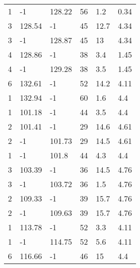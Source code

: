 \begin{table*}[h!]
\begin{tabular*}{\linewidth}{p{50pt}<{\centering}p{50pt}<{\centering}
p{60pt}<{\centering}p{60pt}<{\centering}p{60pt}<{\centering}p{70pt}<{\centering}}
1 & -1 & 128.22 & 56 & 1.2 & 0.34 \\
3 & 128.54 & -1 & 45 & 12.7 & 4.34 \\
3 & -1 & 128.87 & 45 & 13 & 4.34 \\
4 & 128.86 & -1 & 38 & 3.4 & 1.45 \\
4 & -1 & 129.28 & 38 & 3.5 & 1.45 \\
6 & 132.61 & -1 & 52 & 14.2 & 4.11 \\
1 & 132.94 & -1 & 60 & 1.6 & 4.4 \\
1 & 101.18 & -1 & 44 & 3.5 & 4.4 \\
2 & 101.41 & -1 & 29 & 14.6 & 4.61 \\
2 & -1 & 101.73 & 29 & 14.5 & 4.61 \\
1 & -1 & 101.8 & 44 & 4.3 & 4.4 \\
3 & 103.39 & -1 & 36 & 14.5 & 4.76 \\
3 & -1 & 103.72 & 36 & 1.5 & 4.76 \\
2 & 109.33 & -1 & 39 & 15.7 & 4.76 \\
2 & -1 & 109.63 & 39 & 15.7 & 4.76 \\
1 & 113.78 & -1 & 52 & 3.3 & 4.11 \\
1 & -1 & 114.75 & 52 & 5.6 & 4.11 \\
6 & 116.66 & -1 & 46 & 15 & 4.4 \\
\bottomrule
  \end{tabular*}
  \label{Ap4}
\end{table*}



